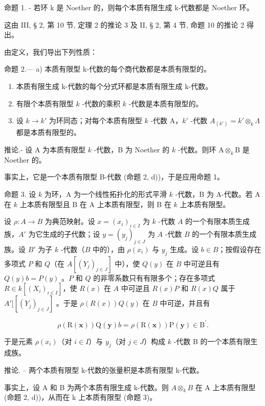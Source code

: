 命题 1. - 若环 k 是 Noether 的，则每个本质有限生成 k-代数都是 Noether 环。

这由 III, § 2, 第 10 节, 定理 2 的推论 3 及 II, § 2, 第 4 节, 命题 10 的推论 2 得出。

由定义，我们导出下列性质：

命题 2.--- a) 本质有限型 k-代数的每个商代数都是本质有限型的。

\begin{enumerate}
\def\labelenumi{\alph{enumi})}
\setcounter{enumi}{1}
\item
  本质有限生成 k-代数的每个分式环都是本质有限生成 k-代数。
\item
  有限个本质有限型 \(k\) -代数的乘积 \(k\) -代数是本质有限型的。
\item
  设 \(k \to k'\) 为环同态；对每个本质有限型 \(k\) -代数 A，\(k'\) -代数 \(A_{(k')} = k' \otimes_k \Lambda\) 都是本质有限型的。
\end{enumerate}

推论.- 设 A 为本质有限型 \(k\) -代数，B 为 Noether 的 \(k\) -代数。则环 \(\mathrm{A} \otimes_k \mathrm{B}\) 是 Noether 的。

事实上，它是一个本质有限型 B-代数 (命题 2, d))，于是应用命题 1。

命题 3. 设 \(k\) 为环，A 为一个线性拓扑化的形式平滑 \(k\) -代数，B 为 A-代数。若 A 在 \(k\) 上本质有限型且 B 在 A 上本质有限型，则 B 在 \(k\) 上本质有限型。

设 \(\rho: A \to B\) 为典范映射。设 \(x = (x_i)_{i \in I}\) 为 \(k\) -代数 \(A\) 的一个有限本质生成族，\(A'\) 为它生成的子代数；设 \(y = (y_j)_{j \in J}\) 为 \(A\) -代数 \(B\) 的一个有限本质生成族。设 \(B'\) 为子 \(k\) -代数（\(B\) 中的），由 \(\rho(x_i)\) 与 \(y_j\) 生成。设 \(b \in B\)；按假设存在多项式 \(P\) 和 \(Q\)（在 \(A[(Y_j)_{j \in J}]\) 中），使 \(Q(y)\) 在 \(B\) 中可逆且有 \(Q(y)b = P(y)\) 。\(P\) 和 \(Q\) 的非零系数只有有限多个；存在多项式 \(R \in k[(X_i)_{i \in I}]\)，使 \(R(x)\) 在 \(A\) 中可逆且 \(R(x)P\) 和 \(R(x)Q\) 属于 \(A'[[(Y_j)_{j \in J}]\) 。于是 \(\rho(R(x))Q(y)\) 在 \(B\) 中可逆，并且有

\[
\rho (\mathrm{R} (\mathbf {x})) \mathrm{Q} (\mathbf {y}) b = \rho (\mathrm{R} (\mathbf {x})) \mathrm{P} (\mathbf {y}) \in \mathrm{B} ^ {\prime}.
\]

于是元素 \(\rho(x_i)\)（对 \(i \in I\)）与 \(y_j\)（对 \(j \in J\)）构成 \(k\) -代数 B 的一个本质有限生成族。

推论. -- 两个本质有限型 k-代数的张量积是本质有限型 k-代数。

事实上，设 A 和 B 为两个本质有限生成 k-代数。则 \(A \otimes_{k} B\) 在 A 上本质有限型 (命题 2, d))，从而在 k 上本质有限型 (命题 3)。

